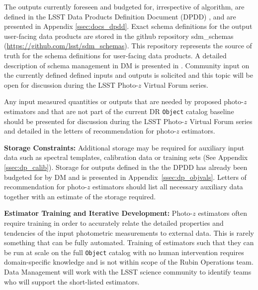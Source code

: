 \documentclass[DM,lsstdraft,toc]{lsstdoc}
\begin{document}
The outputs currently foreseen and budgeted for, irrespective of algorithm, are defined in the LSST Data Products Definition Document (DPDD) \cite{LSE-163}, and are presented in Appendix \ref{ssec:docs_dpdd}. 
Exact schema definitions for the output user-facing data products are stored in the github repository sdm\_schemas (\url{https://github.com/lsst/sdm\_schemas}). 
This repository represents the source of truth for the schema definitions for user-facing data products.
A detailed description of schema management in DM is presented in \cite{dmtn-153}. 
Community input on the currently defined defined inputs and outputs is solicited and this topic will be open for discussion during the LSST Photo-$z$ Virtual Forum series. 

Any input measured quantities or outputs that are needed by proposed photo-$z$ estimators and that are not part of the current DR {\tt Object} catalog baseline should be presented for discussion during the LSST Photo-$z$ Virtual Forum series and detailed in the letters of recommendation for photo-$z$ estimators. 

\textbf{Storage Constraints:}
Additional storage may be required for auxiliary input data such as spectral templates, calibration data or training sets (See Appendix \ref{ssec:dp_calib}). 
Storage for outputs defined in the the DPDD \cite{LSE-163} has already been budgeted for by DM and is presented in Appendix~\ref{ssec:dp_objvals}. 
Letters of recommendation for photo-$z$ estimators should list all necessary auxiliary data together with an estimate of the storage required.

\textbf{Estimator Training and Iterative Development:}
Photo-$z$ estimators often require training in order to accurately relate the detailed properties and tendencies of the input photometric measurements to external data.
This is rarely something that can be fully automated.
Training of estimators such that they can be run at scale on the full {\tt Object} catalog with no human intervention requires domain-specific knowledge and is not within scope of the Rubin Operations team. 
Data Management will work with the LSST science community to identify teams who will support the short-listed estimators.
\end{document}
